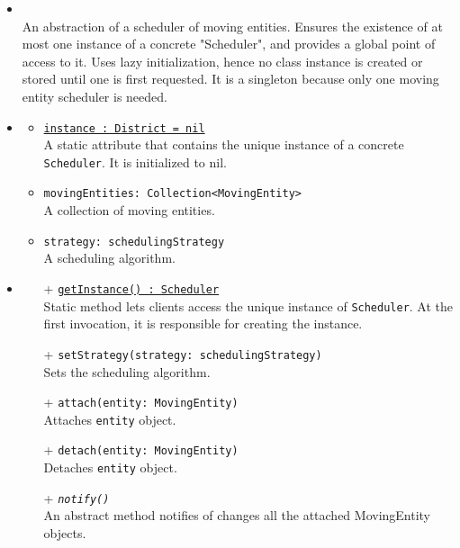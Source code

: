 \begin{itemize}
  \item \textbf{\descr} \\
  An abstraction of a scheduler of moving entities.
  Ensures the existence of at most one instance of a concrete "Scheduler", 
  and provides a global point of access to it.
  Uses lazy initialization, hence no class instance is created 
  or stored until one is first requested.
  It is a singleton because only one moving entity scheduler is needed.
  \item \textbf{\attrs}
  \begin{itemize}
    \item \texttt{\underline{instance : District = nil}} \\
    A static attribute that contains the unique instance 
    of a concrete \texttt{Scheduler}. It is initialized to nil.
    \item \texttt{movingEntities: Collection<MovingEntity>} \\
	A collection of moving entities.
	\item \texttt{strategy: schedulingStrategy} \\
	A scheduling algorithm.
  \end{itemize}
  \item \textbf{\ops}
  \begin{itemize}
    \item[+] \texttt{\underline{getInstance() : Scheduler}} \\
    Static method lets clients access the unique instance 
    of \texttt{Scheduler}. At the first invocation, it is responsible 
    for creating the instance.
    \item[+] \texttt{setStrategy(strategy: schedulingStrategy)} \\
    Sets the scheduling algorithm.
    \item[+] \texttt{attach(entity: MovingEntity)} \\
    Attaches \texttt{entity} object.
	\item[+] \texttt{detach(entity: MovingEntity)} \\
	Detaches \texttt{entity} object.
	\item[+] \texttt{\textit{notify()}} \\
	An abstract method notifies of changes all the attached MovingEntity objects.
  \end{itemize}
\end{itemize}
